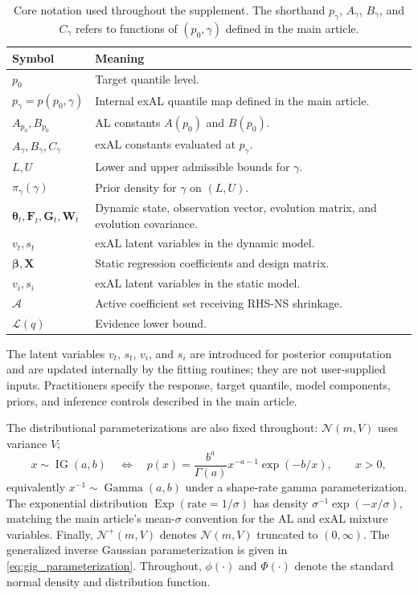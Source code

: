 \documentclass[nojss,noheadings]{jss}
\newcommand{\vect}[1]{\bm{#1}}
\newcommand{\mat}[1]{\mathbf{#1}}
\newcommand{\N}{\mathcal{N}}
\newcommand{\TNp}{\mathcal{N}^{+}}
\newcommand{\IG}{\operatorname{IG}}
\newcommand{\Exp}{\operatorname{Exp}}
\newcommand{\elbo}{\mathcal{L}}
\newcommand{\pigamma}{\pi_\gamma}
\newcommand{\TableStyle}{\footnotesize\setlength{\tabcolsep}{4pt}\renewcommand{\arraystretch}{1.08}}
\begin{document}
\begin{table}[!htb]
\centering
\begingroup
\TableStyle
\begin{tabularx}{\textwidth}{@{}lX@{}}
\toprule
Symbol & Meaning \\
\midrule
$p_0$ & Target quantile level. \\
$p_\gamma=p(p_0,\gamma)$ & Internal exAL quantile map defined in the main article. \\
$A_{p_0},B_{p_0}$ & AL constants $A(p_0)$ and $B(p_0)$. \\
$A_\gamma,B_\gamma,C_\gamma$ & exAL constants evaluated at $p_\gamma$. \\
$L,U$ & Lower and upper admissible bounds for $\gamma$. \\
$\pigamma(\gamma)$ & Prior density for $\gamma$ on $(L,U)$. \\
$\vect{\theta}_t,\mat{F}_t,\mat{G}_t,\mat{W}_t$ & Dynamic state, observation vector, evolution matrix, and evolution covariance. \\
$v_t,s_t$ & exAL latent variables in the dynamic model. \\
$\vect{\beta},\mat{X}$ & Static regression coefficients and design matrix. \\
$v_i,s_i$ & exAL latent variables in the static model. \\
$\mathcal{A}$ & Active coefficient set receiving RHS-NS shrinkage. \\
$\elbo(q)$ & Evidence lower bound. \\
\bottomrule
\end{tabularx}
\endgroup
\caption{Core notation used throughout the supplement. The shorthand
$p_\gamma$, $A_\gamma$, $B_\gamma$, and $C_\gamma$ refers to functions of
$(p_0,\gamma)$ defined in the main article.}
\label{tab:supp_notation}
\end{table}

The latent variables $v_t$, $s_t$, $v_i$, and $s_i$ are introduced for
posterior computation and are updated internally by the fitting routines; they
are not user-supplied inputs. Practitioners specify the response, target
quantile, model components, priors, and inference controls described in the
main article.

The distributional parameterizations are also fixed throughout:
$\N(m,V)$ uses variance $V$;
\begin{equation}
x\sim\IG(a,b)
\quad\Longleftrightarrow\quad
p(x)=\frac{b^a}{\Gamma(a)}x^{-a-1}\exp(-b/x),\qquad x>0,
\end{equation}
equivalently $x^{-1}\sim\operatorname{Gamma}(a,b)$ under a shape-rate gamma
parameterization. The exponential distribution $\Exp(\text{rate}=1/\sigma)$
has density $\sigma^{-1}\exp(-x/\sigma)$, matching the main article's
mean-$\sigma$ convention for the AL and exAL mixture variables. Finally,
$\TNp(m,V)$ denotes $\N(m,V)$ truncated to $(0,\infty)$. The generalized
inverse Gaussian parameterization is given in \eqref{eq:gig_parameterization}.
Throughout, $\phi(\cdot)$ and $\Phi(\cdot)$ denote the standard normal density
and distribution function.
\end{document}
